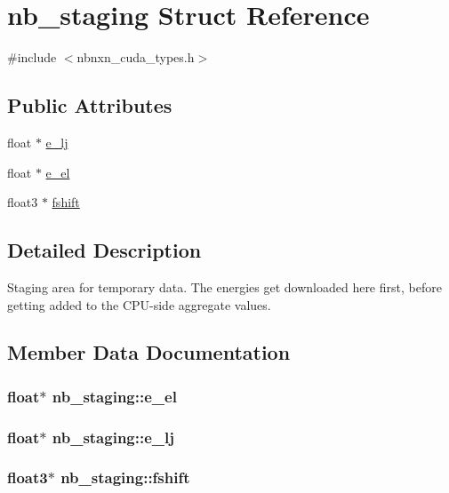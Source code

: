 \hypertarget{structnb__staging}{\section{nb\-\_\-staging \-Struct \-Reference}
\label{structnb__staging}
}


{\ttfamily \#include $<$nbnxn\-\_\-cuda\-\_\-types.\-h$>$}

\subsection*{\-Public \-Attributes}
\begin{DoxyCompactItemize}
\item 
float $\ast$ \hyperlink{structnb__staging_ac6170e16fd34968bd7280cb643c6bd39}{e\-\_\-lj}
\item 
float $\ast$ \hyperlink{structnb__staging_a5daa94b0b42d2ace459f89208973f995}{e\-\_\-el}
\item 
float3 $\ast$ \hyperlink{structnb__staging_ac195963c740ab7e9d1cd6f484d48721d}{fshift}
\end{DoxyCompactItemize}


\subsection{\-Detailed \-Description}
\-Staging area for temporary data. \-The energies get downloaded here first, before getting added to the \-C\-P\-U-\/side aggregate values. 

\subsection{\-Member \-Data \-Documentation}
\hypertarget{structnb__staging_a5daa94b0b42d2ace459f89208973f995}{
\subsubsection[{e\-\_\-el}]{\setlength{\rightskip}{0pt plus 5cm}float$\ast$ {\bf nb\-\_\-staging\-::e\-\_\-el}}}\label{structnb__staging_a5daa94b0b42d2ace459f89208973f995}
\hypertarget{structnb__staging_ac6170e16fd34968bd7280cb643c6bd39}{
\subsubsection[{e\-\_\-lj}]{\setlength{\rightskip}{0pt plus 5cm}float$\ast$ {\bf nb\-\_\-staging\-::e\-\_\-lj}}}\label{structnb__staging_ac6170e16fd34968bd7280cb643c6bd39}
\hypertarget{structnb__staging_ac195963c740ab7e9d1cd6f484d48721d}{
\subsubsection[{fshift}]{\setlength{\rightskip}{0pt plus 5cm}float3$\ast$ {\bf nb\-\_\-staging\-::fshift}}}\label{structnb__staging_ac195963c740ab7e9d1cd6f484d48721d}


